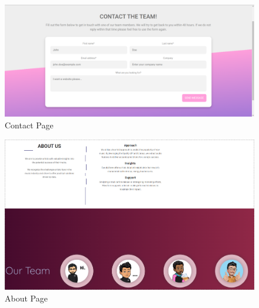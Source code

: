 \documentclass[11pt]{report}
\begin{document}
\begin{figure}[h]
    \centering
    \includegraphics[height=.45\linewidth]{screenshots/11.contact.png}
    \caption{Contact Page}
\end{figure}
\begin{figure}[h]
    \centering
    \includegraphics[height=.6\linewidth]{screenshots/about.png}
    \caption{About Page}
\end{figure}
    
   

   
\end{document}
